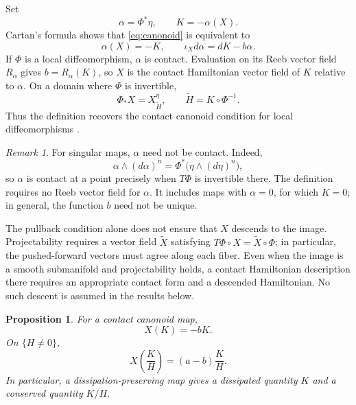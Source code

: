 \documentclass[11pt,a4paper]{article}
\numberwithin{equation}{section}
\newtheorem{proposition}{Proposition}
\theoremstyle{definition}
\theoremstyle{remark}
\newtheorem{remark}{Remark}
\begin{document}
Set
\begin{equation}
\alpha=\Phi^*\eta,\qquad K=-\alpha(X).
\label{eq:alpha-K}
\end{equation}
Cartan's formula shows that \eqref{eq:canonoid} is equivalent to
\begin{equation}
\alpha(X)=-K,\qquad
\iota_Xd\alpha=dK-b\alpha.
\label{eq:pullback-equations}
\end{equation}
If $\Phi$ is a local diffeomorphism, $\alpha$ is contact.
Evaluation on its Reeb vector field $R_\alpha$ gives
$b=R_\alpha(K)$, so $X$ is the contact Hamiltonian vector field of
$K$ relative to $\alpha$. On a domain where $\Phi$ is invertible,
\begin{equation}
\Phi_*X=X_{\widetilde H}^{\eta},
\qquad
\widetilde H=K\circ\Phi^{-1}.
\label{eq:target}
\end{equation}
Thus the definition recovers the contact canonoid condition
for local diffeomorphisms
\cite{azuaje2023canonical,azuaje2024scaling}.

\begin{remark}
For singular maps, $\alpha$ need not be contact. Indeed,
\[
\alpha\wedge(d\alpha)^n
=\Phi^*\bigl(\eta\wedge(d\eta)^n\bigr),
\]
so $\alpha$ is contact at a point precisely when $T\Phi$ is
invertible there. The definition requires no Reeb vector field
for $\alpha$. It includes maps with $\alpha=0$, for which $K=0$;
in general, the function $b$ need not be unique.

The pullback condition alone does not ensure that $X$ descends
to the image. Projectability requires a vector field
$\widetilde X$ satisfying
$T\Phi\circ X=\widetilde X\circ\Phi$; in particular, the
pushed-forward vectors must agree along each fiber.
Even when the image is a smooth submanifold and projectability
holds, a contact Hamiltonian description there requires an
appropriate contact form and a descended Hamiltonian.
No such descent is assumed in the results below.
\end{remark}

\begin{proposition}
\label{prop:balance}
For a contact canonoid map,
\begin{equation}
X(K)=-bK.
\label{eq:K-rate}
\end{equation}
On $\{H\neq0\}$,
\begin{equation}
X\left(\frac KH\right)=(a-b)\frac KH.
\label{eq:ratio-rate}
\end{equation}
In particular, a dissipation-preserving map gives a dissipated
quantity $K$ and a conserved quantity $K/H$.
\end{proposition}
\end{document}

